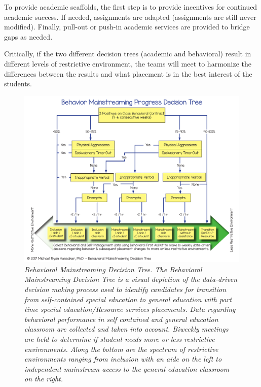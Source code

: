 \documentclass[twoside]{article}
\begin{document}
To provide academic scaffolds, the first step is to provide incentives for continued academic success. If needed, assignments are adapted (assignments are still never modified). Finally, pull-out or push-in academic services are provided to bridge gaps as needed.

Critically, if the two different decision trees (academic and behavioral) result in different levels of restrictive environment, the teams will meet to harmonize the differences between the results and what placement is in the best interest of the students. 
%
%
%
%
\begin{figure}[htp!]
	\centering
	\includegraphics[width=\textwidth]{BehaviorPipeline.pdf}
	\caption[Behaviroal Mainstreaming Decision Tree]{\textit{Behavioral Mainstreaming Decision Tree. The Behavioral Mainstreaming Decision Tree is a visual depiction of the data-driven decision making process used to identify candidates for transition from self-contained special education to general education with part time special education/Resource services placements. Data regarding behavioral performance in self contained and general education classroom are collected and taken into account. Biweekly meetings are held to determine if student needs more or less restrictive environments. Along the bottom are the spectrum of restrictive environments ranging from inclusion with an aide on the left to independent mainstream access to the general education classroom on the right.}}
	\label{fig3}
\end{figure}
%
%
%
\end{document}
